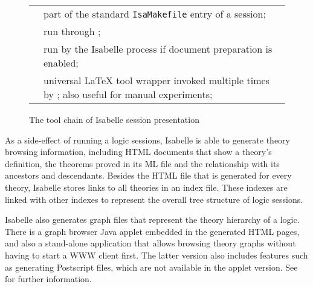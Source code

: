 \begin{isabellebody}
\begin{isamarkuptext}
\begin{figure}[htbp]
\begin{center}
\begin{tabular}{lp{}}
      \hyperlink{tool.usedir}{\mbox{\isa{\isatool{usedir}}}} & part of the standard \verb|IsaMakefile|
      entry of a session; \\

      \hyperlink{executable.isabelle-process}{\mbox{\isa{\isatt{isabelle{\isaliteral{2D}{\isacharminus}}process}}}} & run through \indexref{}{tool}{usedir}\hyperlink{tool.usedir}{\mbox{\isa{\isatool{usedir}}}}; \\

      \indexref{}{tool}{document}\hyperlink{tool.document}{\mbox{\isa{\isatool{document}}}} & run by the Isabelle process if document
      preparation is enabled; \\

      \indexref{}{tool}{latex}\hyperlink{tool.latex}{\mbox{\isa{\isatool{latex}}}} & universal {\LaTeX} tool wrapper invoked
      multiple times by \indexref{}{tool}{document}\hyperlink{tool.document}{\mbox{\isa{\isatool{document}}}}; also useful for manual
      experiments; \\

  \end{tabular}
  \caption{The tool chain of Isabelle session presentation} \label{fig:session-tools}
  \end{center}
  \end{figure}%
\end{isamarkuptext}%
\isamarkuptrue%
%
\isamarkuptrue%
%
\begin{isamarkuptext}%

  As a side-effect of running a logic sessions, Isabelle is able to
  generate theory browsing information, including HTML documents that
  show a theory's definition, the theorems proved in its ML file and
  the relationship with its ancestors and descendants.  Besides the
  HTML file that is generated for every theory, Isabelle stores links
  to all theories in an index file. These indexes are linked with
  other indexes to represent the overall tree structure of logic
  sessions.

  Isabelle also generates graph files that represent the theory
  hierarchy of a logic.  There is a graph browser Java applet embedded
  in the generated HTML pages, and also a stand-alone application that
  allows browsing theory graphs without having to start a WWW client
  first.  The latter version also includes features such as generating
  Postscript files, which are not available in the applet version.
  See  for further information.


\end{isamarkuptext}
\end{isabellebody}
